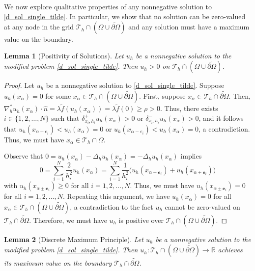 \documentclass[12pt, reqno]{amsart}
\numberwithin{equation}{section}
\newtheorem{lem}{Lemma}[section]
\begin{document}
We now explore qualitative properties of any nonnegative solution to \eqref{d_sol_single_tilde}.  
In particular, we show that no solution can be zero-valued at any node in the grid $\mathcal{T}_h \cap (\Omega \cup \widetilde{\partial \Omega})$ and any solution must have a maximum value on the boundary.  

\begin{lem}[Positivity of Solutions]
\label{lem:positivity}
Let $u_h$ be a nonnegative solution to the modified problem \eqref{d_sol_single_tilde}. Then $u_h > 0$ on $\mathcal{T}_h \cap (\Omega \cup \widetilde{\partial \Omega})$.
\end{lem}

\begin{proof}
Let $u_h$ be a nonnegative solution to \eqref{d_sol_single_tilde}. 
Suppose $u_h(x_\alpha) = 0$ for some $x_\alpha \in \mathcal{T}_h \cap (\Omega \cup \widetilde{\partial \Omega})$.  
First, suppose $x_\alpha \in \mathcal{T}_h \cap \widetilde{\partial \Omega}$.  
Then, 
$\nabla_h^* u_h(x_\alpha) \cdot \widehat{n} = \lambda \widetilde{f}(u_h(x_\alpha)) = \lambda \widetilde{f}(0) \geq \rho > 0$.  
Thus, there exists $i \in \{1,2,\ldots,N\}$ such that 
$\delta_{x_i, h_i}^+ u_h(x_\alpha) > 0$ or $\delta_{x_i, h_i}^- u_h(x_\alpha) > 0$, and it follows that 
$u_h(x_{\alpha+e_i}) < u_h(x_\alpha) = 0$ or $u_h(x_{\alpha-e_i}) < u_h(x_\alpha) = 0$, 
a contradiction.  
Thus, we must have $x_\alpha \in \mathcal{T}_h \cap \Omega$.  

Observe that $0 = u_h(x_\alpha) - \Delta_h u_h(x_\alpha) = -\Delta_h u_h(x_\alpha)$ implies 
\[
    0 = \sum_{i=1}^N \frac{2}{h_i^2} u_h(x_\alpha) = 
    \sum_{i=1}^N \frac{1}{h_i^2} \big( u_h(x_{\alpha-\mathbf{e}_i}) + u_h(x_{\alpha+\mathbf{e}_i}) \big) 
\]
with $u_h(x_{\alpha\pm\mathbf{e}_i}) \geq 0$ for all $i=1,2,\ldots,N$.  
Thus, we must have $u_h(x_{\alpha\pm\mathbf{e}_i}) = 0$ for all $i= 1,2,\ldots,N$.  
Repeating this argument, we have $u_h(x_{\alpha}) = 0$ for all 
$x_\alpha \in \mathcal{T}_h \cap (\Omega \cup \widetilde{\partial \Omega})$, 
a contradiction to the fact $u_h$ cannot be zero-valued on $\mathcal{T}_h \cap \widetilde{\partial \Omega}$.  
Therefore, we must have $u_h$ is positive over $\mathcal{T}_h \cap (\Omega \cup \widetilde{\partial \Omega})$.  
\end{proof}


\begin{lem}[Discrete Maximum Principle]
\label{lem:discrete_max_principle}
Let $u_h$ be a nonnegative solution to the modified problem \eqref{d_sol_single_tilde}. Then $u_h : \mathcal{T}_h \cap (\Omega \cup \widetilde{\partial \Omega}) \to \mathbb{R}$ achieves its maximum value on the boundary $\mathcal{T}_h \cap \widetilde{\partial \Omega}$.
\end{lem}
\end{document}
